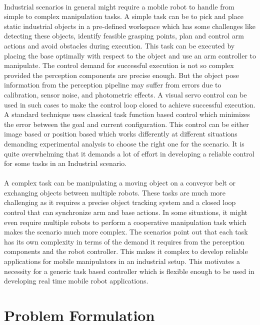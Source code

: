  \paragraph{}
 Industrial scenarios in general might require a mobile robot to handle from simple to complex manipulation tasks. A simple task can be to pick and place static industrial objects in a pre-defined workspace which has some challenges like detecting these objects, identify feasible grasping points, plan and control arm actions and avoid obstacles during execution. This task can be executed by placing the base optimally with respect to the object and use an arm controller to manipulate. The control demand for successful execution is not so complex provided the perception components are precise enough. But the object pose information from the perception pipeline may suffer from errors due to calibration, sensor noise, and photometric effects. A visual servo control can be used in such cases to make the control loop closed to achieve successful execution. A standard technique uses classical task function based control which minimizes the error between the goal and current configuration. This control can be either 
image based or position based which works differently at different situations demanding experimental analysis to choose the right one for the scenario. It is quite overwhelming that it demands a lot of effort in developing a reliable control for some tasks in an Industrial scenario. 
 
  \paragraph{}
  A complex task can be manipulating a moving object on a conveyor belt or exchanging objects between multiple robots. These tasks are much more challenging as it requires a precise object tracking system and a closed loop control that can synchronize arm and base actions. In some situations, it might even require multiple robots to perform a cooperative manipulation task which makes the scenario much more complex. The scenarios point out that each task has its own complexity in terms of the demand it requires from the perception components and the robot controller. This makes it complex to develop reliable applications for mobile manipulators in an industrial setup. This motivates a necessity for a generic task based controller which is flexible enough to be used in developing real time mobile robot applications. 

 \section{Problem Formulation}
